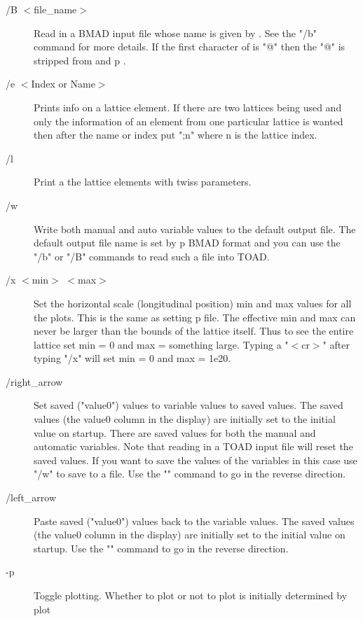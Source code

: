 \begin{description}
\item[/B $<$file\_name$>$]   
Read in a BMAD input file whose name is given by . See the
"/b" command for more details. If the first character of  is
"@" then the "@" is stripped from   and p%
.

\item[/e $<$Index or Name$>$]
Prints info on a lattice element. If there are two lattices being used
and only the information of an element from one particular lattice is wanted
then after the name or index put ";n" where n is the lattice index.

\item[/l]
Print a the lattice elements with twiss parameters.

\item[/w]
Write both manual and auto variable values to the default output file. 
The default output file name is set by p%
BMAD format and you can use the "/b" or "/B" commands to read such a file into
TOAD.

\item[/x $<$min$>$ $<$max$>$]
Set the horizontal scale (longitudinal position) min and max values for all
the plots. This is the same as setting p%
file. The effective min and max can never be larger than the bounds of the
lattice itself. Thus to see the entire lattice set min = 0 and max = something
large. Typing a "$<$cr$>$" after typing "/x" will set min = 0 and max = 1e20.

\item[/right\_arrow]
Set saved ("value0") values to variable values to saved values. 
The saved values (the value0 column in the display) are initially set to  the
initial value on startup. There are saved values for both the manual and
automatic variables. Note that reading in a TOAD input file will reset the
saved values. If you want to save the values of the variables in this case use
"/w" to save to a file. Use the "" command to go in the
reverse direction.

\item[/left\_arrow]
Paste saved ("value0") values back to the variable values. 
The saved values (the value0 column in the display) are initially set to the
initial value  on startup. Use the "" command to go in the
reverse direction.

\item[-p]
Toggle plotting. Whether to plot or not to plot is initially determined by
plot%

\end{description}
